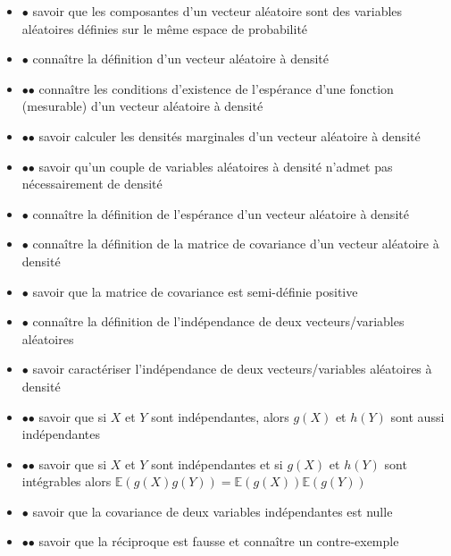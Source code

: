\begin{itemize}
\tightlist
\item
  $\mathord{\bullet}$ savoir que les composantes d'un vecteur aléatoire
  sont des variables aléatoires définies sur le même espace de
  probabilité
\item
  $\mathord{\bullet}$ connaître la définition d'un vecteur aléatoire à
  densité
\item
  $\mathord{\bullet}\mathord{\bullet}$ connaître les conditions
  d'existence de l'espérance d'une fonction (mesurable) d'un vecteur
  aléatoire à densité
\item
  $\mathord{\bullet}\mathord{\bullet}$ savoir calculer les densités
  marginales d'un vecteur aléatoire à densité
\item
  $\mathord{\bullet}\mathord{\bullet}$ savoir qu'un couple de variables
  aléatoires à densité n'admet pas nécessairement de densité
\item
  $\mathord{\bullet}$ connaître la définition de l'espérance d'un
  vecteur aléatoire à densité
\item
  $\mathord{\bullet}$ connaître la définition de la matrice de
  covariance d'un vecteur aléatoire à densité
\item
  $\mathord{\bullet}$ savoir que la matrice de covariance est
  semi-définie positive
\end{itemize}

\label{II-variables-et-vecteurs-aluxe9atoires-induxe9pendantes}

\begin{itemize}
\tightlist
\item
  $\mathord{\bullet}$ connaître la définition de l'indépendance de deux
  vecteurs/variables aléatoires
\item
  $\mathord{\bullet}$ savoir caractériser l'indépendance de deux
  vecteurs/variables aléatoires à densité
\item
  $\mathord{\bullet}\mathord{\bullet}$ savoir que si \(X\) et \(Y\) sont
  indépendantes, alors \(g(X)\) et \(h(Y)\) sont aussi indépendantes
\item
  $\mathord{\bullet}\mathord{\bullet}$ savoir que si \(X\) et \(Y\) sont
  indépendantes et si \(g(X)\) et \(h(Y)\) sont intégrables alors
  \(\mathbb{E}(g(X)g(Y)) = \mathbb{E}(g(X))\mathbb{E}(g(Y))\)
\item
  $\mathord{\bullet}$ savoir que la covariance de deux variables
  indépendantes est nulle
\item
  $\mathord{\bullet}\mathord{\bullet}$ savoir que la réciproque est
  fausse et connaître un contre-exemple
\end{itemize}

